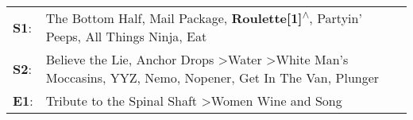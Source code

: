 \begin{supertabular}{p{0.03\textwidth}p{0.92\textwidth}}
 \textbf{S1}:  &                                                                                                                 The Bottom Half\textsuperscript{}, \enspace Mail Package\textsuperscript{}, \enspace \textbf{Roulette[1]\textsuperscript{$\wedge$}}, \enspace Partyin' Peeps\textsuperscript{}, \enspace All Things Ninja\textsuperscript{}, \enspace Eat\textsuperscript{}  \enspace  \\
 \textbf{S2}:  &  Believe the Lie\textsuperscript{}, \enspace Anchor Drops\textsuperscript{} \textgreater \enspace Water\textsuperscript{} \textgreater \enspace White Man's Moccasins\textsuperscript{}, \enspace YYZ\textsuperscript{}, \enspace Nemo\textsuperscript{}, \enspace Nopener\textsuperscript{}, \enspace Get In The Van\textsuperscript{}, \enspace Plunger\textsuperscript{}  \enspace  \\
 \textbf{E1}:  &                                                                                                                                                                                                                                                                   Tribute to the Spinal Shaft\textsuperscript{} \textgreater \enspace Women Wine and Song\textsuperscript{}  \enspace  \\
\end{supertabular}
